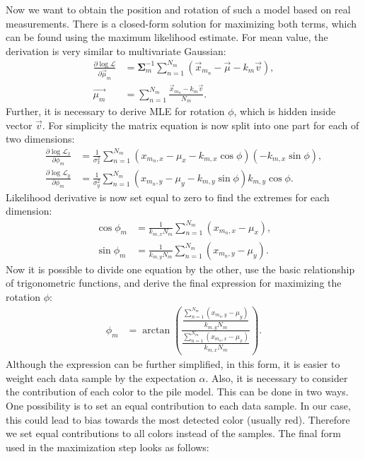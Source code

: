  Now we want to obtain the position and rotation of such a model based on real measurements. There is a closed-form solution for maximizing both terms, which can be found using the maximum likelihood estimate. For mean value, the derivation is very similar to multivariate Gaussian:
\begin{align}
\frac{\partial \log\mathcal{L} }{\partial \vec{\mu}_m} &=  \bm{\Sigma}^{-1}_m \sum_{n = 1}^{N_m} (\vec{x}_{m_n} - \vec{\mu} - k_m \vec{v}), \\
\vec{\mu_m} &= \sum_{n = 1}^{N_m} \frac{\vec{x}_{m_n} - k_m \vec{v}}{N_m}.
\end{align}
Further, it is necessary to derive MLE for rotation $\phi$, which is hidden inside vector $\vec{v}$. For simplicity the matrix equation is now split into one part for each of two dimensions:
\begin{align}
\frac{\partial \log\mathcal{L}_x }{\partial \phi_m} &= \frac{1}{\sigma^2_x} \sum_{n=1}^{N_m} (x_{m_n, x} - \mu_x - k_{m, x} \cos \phi) \left( -k_{m,x} \sin \phi\right),  \\
\frac{\partial \log\mathcal{L}_y }{\partial \phi_m} &= \frac{1}{\sigma^2_y} \sum_{n=1}^{N_m} (x_{m_n, y} - \mu_y - k_{m, y} \sin \phi) k_{m,y} \cos \phi.
\end{align}
Likelihood derivative is now set equal to zero to find the extremes for each dimension:
\begin{align}
\cos \phi_m &= \frac{1}{k_{m, x}N_m} \sum_{n = 1}^{N_m} \left(  x_{m_n, x} - \mu_x \right)  , \\ 
\sin \phi_m &=  \frac{1}{k_{m, y}N_m} \sum_{n = 1}^{N_m} \left(  x_{m_n, y} - \mu_y \right)  .
\end{align}
Now it is possible to divide one equation by the other, use the basic relationship of trigonometric functions, and derive the final expression for maximizing the rotation $\phi$:
\begin{align}
\phi_m &= \arctan \left( \frac{\dfrac{\sum_{n = 1}^{N_m} \left( x_{m_n, y} - \mu_y \right)}{k_{m, y}N_m} }{ \dfrac{\sum_{n = 1}^{N_m} \left( x_{m_n, x} - \mu_x \right)}{k_{m, x}N_m} }\right).
\end{align}
Although the expression can be further simplified, in this form, it is easier to weight each data sample by the expectation $\alpha$. Also, it is necessary to consider the contribution of each color to the pile model. This can be done in two ways. One possibility is to set an equal contribution to each data sample. In our case, this could lead to bias towards the most detected color (usually red). Therefore we set equal contributions to all colors instead of the samples. The final form used in the maximization step looks as follows:
